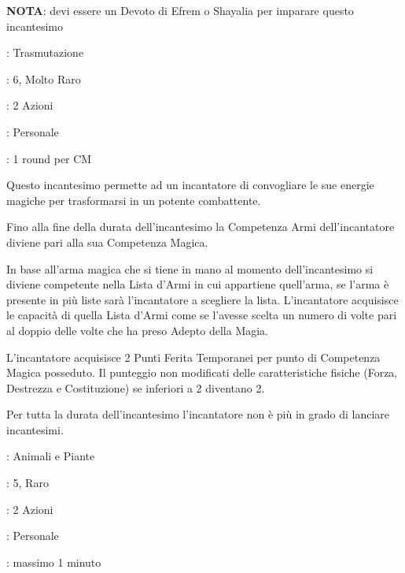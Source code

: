 \begin{multicols}{2}
\textbf{NOTA}: devi essere un Devoto di Efrem o Shayalia per imparare questo incantesimo

\noindent\colorbox{OBSSgold!10}{
\begin{minipage}{0.95\linewidth}
\begin{description}[noitemsep, topsep=0pt, parsep=0pt, partopsep=0pt, leftmargin=0cm, labelwidth=1.3cm]
	\item[\textbf{Lista}]: Trasmutazione
	\item[\textbf{Livello}]: 6, Molto Raro
	\item[\textbf{Lancio}]: 2 Azioni
	\item[\textbf{Gittata}]: Personale
	\item[\textbf{Durata}]: 1 round per CM
\end{description}
\end{minipage}}\smallskip

Questo incantesimo permette ad un incantatore di convogliare le sue energie magiche per trasformarsi in un potente combattente.

Fino alla fine della durata dell'incantesimo la Competenza Armi dell'incantatore diviene pari alla sua Competenza Magica.

In base all'arma magica che si tiene in mano al momento dell'incantesimo si diviene competente nella Lista d'Armi in cui appartiene quell'arma, se l'arma è presente in più liste sarà l'incantatore a scegliere la lista. L'incantatore acquisisce le capacità di quella Lista d'Armi come se l'avesse scelta un numero di volte pari al doppio delle volte che ha preso Adepto della Magia.

L'incantatore acquisisce 2 Punti Ferita Temporanei per punto di Competenza Magica posseduto.
Il punteggio non modificati delle caratteristiche fisiche (Forza, Destrezza e Costituzione) se inferiori a 2 diventano 2.

Per tutta la durata dell'incantesimo l'incantatore non è più in grado di lanciare incantesimi.

\noindent\colorbox{OBSSgold!10}{
\begin{minipage}{0.95\linewidth}
\begin{description}[noitemsep, topsep=0pt, parsep=0pt, partopsep=0pt, leftmargin=0cm, labelwidth=1.3cm]
	\item[\textbf{Lista}]: Animali e Piante
	\item[\textbf{Livello}]: 5, Raro
	\item[\textbf{Lancio}]: 2 Azioni
	\item[\textbf{Gittata}]: Personale
	\item[\textbf{Durata}]: massimo 1 minuto
\end{description}
\end{minipage}}\smallskip


\end{multicols}
